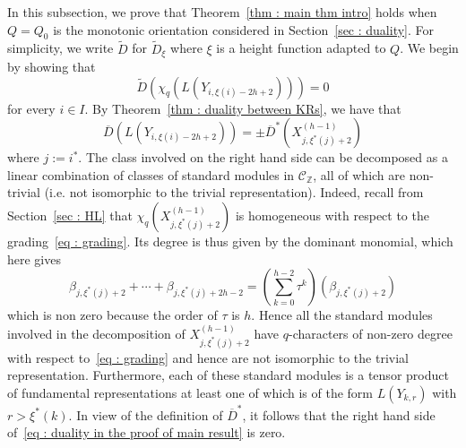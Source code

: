 \documentclass[12pt]{amsart}
\theoremstyle{plain}
\theoremstyle{definition}
\numberwithin{equation}{section}
\newcommand{\td}{{\widetilde{D}}}
\newcommand{\barD}{\overline{D}}
\newcommand{\barDstar}{\overline{D}^{*}}
\newcommand{\CZ}{\mathcal{C}_{\mathbb{Z}}}
\newcommand{\xistar}{\xi^{*}}
\begin{document}
In this subsection, we prove that Theorem~\ref{thm : main thm intro} holds when $Q = Q_0$ is the monotonic orientation considered in Section~\ref{sec : duality}. For simplicity, we write $\td$ for $\td_{\xi}$ where $\xi$ is a height function adapted to $Q$.  We begin by showing that 
  $$ \td \left( \chi_q \left( L(Y_{i, \xi(i)-2h+2}) \right) \right) = 0  $$
  for every $i \in I$. By Theorem~\ref{thm : duality between KRs}, we have that 
  \begin{equation} \label{eq : duality in the proof of main result}
      \barD \left(  L(Y_{i, \xi(i)-2h+2}) \right) = \pm \barDstar \left( X_{j,\xistar(j)+2}^{(h-1)}  \right)
  \end{equation}
  where $j := i^{*}$. The class involved on the right hand side can be decomposed as a linear combination of classes of standard modules in $\CZ$, all of which are non-trivial (i.e. not isomorphic to the trivial representation). Indeed, recall from Section~\ref{sec : HL} that $\chi_q \left( X_{j,\xistar(j)+2}^{(h-1)} \right)$ is homogeneous with respect to the grading~\eqref{eq : grading}. Its degree is thus given by the dominant monomial, which here gives 
  $$ \beta_{j,\xistar(j)+2} + \cdots + \beta_{j, \xistar(j)+2h-2} =  \left( \sum_{k=0}^{h-2} \tau^k \right) (\beta_{j,\xistar(j)+2})   $$
  which is non zero because the order of $\tau$ is $h$. Hence all the standard modules involved in the decomposition of $X_{j,\xistar(j)+2}^{(h-1)}$ have $q$-characters of non-zero degree with respect to~\eqref{eq : grading} and hence are not isomorphic to the trivial representation.  Furthermore, each of these standard modules is a tensor product of fundamental representations at least one of which is of the form  $L(Y_{k,r})$ with $r > \xistar(k)$. 
  In view of the definition of $\barDstar$, it follows that the right hand side of~\eqref{eq : duality in the proof of main result} is zero.
  
\end{document}
